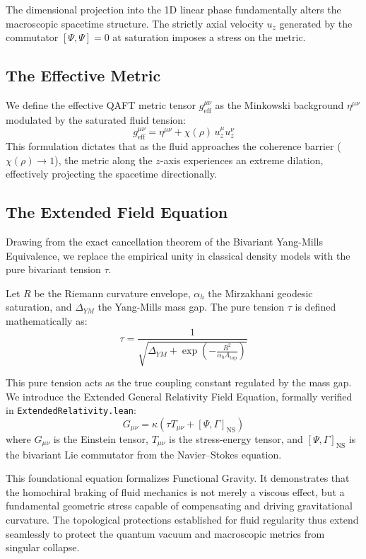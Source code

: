 The dimensional projection into the 1D linear phase fundamentally alters the macroscopic spacetime structure. The strictly axial velocity $u_z$ generated by the commutator $[\Psi, \Psi] = 0$ at saturation imposes a stress on the metric.

\subsection{The Effective Metric}

We define the effective QAFT metric tensor $g^{\mu\nu}_{\text{eff}}$ as the Minkowski background $\eta^{\mu\nu}$ modulated by the saturated fluid tension:
\begin{equation}\label{eq:effective-metric}
g^{\mu\nu}_{\text{eff}} = \eta^{\mu\nu} + \chi(\rho) \, u^\mu_z u^\nu_z
\end{equation}
This formulation dictates that as the fluid approaches the coherence barrier ($\chi(\rho) \to 1$), the metric along the $z$-axis experiences an extreme dilation, effectively projecting the spacetime directionally. 

\subsection{The Extended Field Equation}

Drawing from the exact cancellation theorem of the Bivariant Yang-Mills Equivalence, we replace the empirical unity in classical density models with the pure bivariant tension $\tau$. 

\begin{definition}
Let $R$ be the Riemann curvature envelope, $\alpha_h$ the Mirzakhani geodesic saturation, and $\Delta_{YM}$ the Yang-Mills mass gap. The pure tension $\tau$ is defined mathematically as:
\begin{equation}
\tau = \frac{1}{\sqrt{\Delta_{YM} + \exp{\left(-\frac{R^2}{\alpha_h \Lambda_{\text{top}}}\right)}}}
\end{equation}
\end{definition}

This pure tension acts as the true coupling constant regulated by the mass gap. We introduce the Extended General Relativity Field Equation, formally verified in \texttt{ExtendedRelativity.lean}:
\begin{equation}\label{eq:qa-relativity}
G_{\mu\nu} = \kappa \left( \tau T_{\mu\nu} + [\Psi, \Gamma]_{\text{NS}} \right)
\end{equation}
where $G_{\mu\nu}$ is the Einstein tensor, $T_{\mu\nu}$ is the stress-energy tensor, and $[\Psi, \Gamma]_{\text{NS}}$ is the bivariant Lie commutator from the Navier--Stokes equation.

This foundational equation formalizes Functional Gravity. It demonstrates that the homochiral braking of fluid mechanics is not merely a viscous effect, but a fundamental geometric stress capable of compensating and driving gravitational curvature. The topological protections established for fluid regularity thus extend seamlessly to protect the quantum vacuum and macroscopic metrics from singular collapse.

